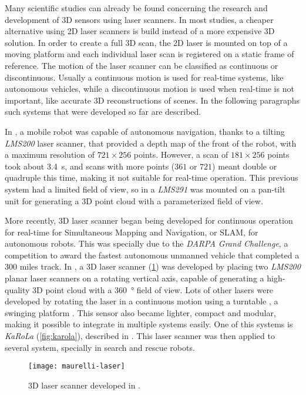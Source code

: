 Many scientific studies can already be found concerning the research and development of 3D sensors using laser scanners. In most studies, a cheaper alternative using 2D laser scanners is build instead of a more expensive 3D solution. In order to create a full 3D scan, the 2D laser is mounted on top of a moving platform and each individual laser scan is registered on a static frame of reference. The motion of the laser scanner can be classified as continuous or discontinuous. Usually a continuous motion is used for real-time systems, like autonomous vehicles, while a discontinuous motion is used when real-time is not important, like accurate 3D reconstructions of scenes. In the following paragraphs such systems that were developed so far are described.

In \cite{surmann2003}, a mobile robot was capable of autonomous navigation, thanks to a tilting \textit{LMS200} laser scanner, that provided a depth map of the front of the robot, with a maximum resolution of $721\times256$ points. However, a scan of $181\times256$ points took about \SI{3.4}{\second}, and scans with more points ($361$ or $721$) meant double or quadruple this time, making it not suitable for real-time operation. This previous system had a limited field of view, so in \cite{zcai05} a \textit{LMS291} was mounted on a pan-tilt unit for generating a 3D point cloud with a parameterized field of view.

More recently, 3D laser scanner began being developed for continuous operation for real-time for Simultaneous Mapping and Navigation, or SLAM, for autonomous robots. This was specially due to the \textit{DARPA Grand Challenge}, a competition to award the fastest autonomous unmanned vehicle that completed a 300 miles track. In \cite{maurelli2009}, a 3D laser scanner (\cref{fig:maurelli-laser-scanner}) was developed by placing two \textit{LMS200} planar laser scanners on a rotating vertical axis, capable of generating a high-quality 3D point cloud with a \SI{360}{\degree} field of view. Lots of other lasers were developed by rotating the laser in a continuous motion using a turntable \cite{nemoto2007}, a swinging platform \cite{yoshida11}. This sensor also became lighter, compact and modular, making it possible to integrate in multiple systems easily. One of this systems is \textit{KaRoLa} (\cref{fig:karola}), described in \cite{karola14}. This laser scanner was then applied to several system, specially in search and rescue robots.

\begin{figure}[h]
    \centering
    \texttt{[image: maurelli-laser]}
    \caption{3D laser scanner developed in \cite{maurelli2009}.}
    \label{fig:maurelli-laser-scanner}
\end{figure}

